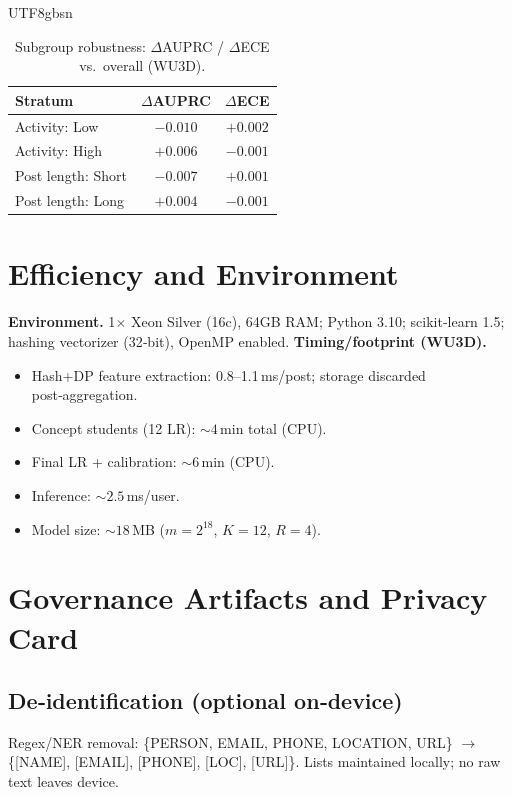 \documentclass[acmsmall,natbib]{acmart}
\begin{document}
\begin{CJK*}{UTF8}{gbsn}
\begin{table}[h]
\centering
\caption{Subgroup robustness: $\Delta$AUPRC / $\Delta$ECE vs.\ overall (WU3D).}
\label{tab:subgroups}
\setlength{\tabcolsep}{6.2pt}
\begin{tabular}{lcc}
\toprule
\textbf{Stratum} & \textbf{$\Delta$AUPRC} & \textbf{$\Delta$ECE} \\
\midrule
Activity: Low  & $-0.010$ & $+0.002$ \\
Activity: High & $+0.006$ & $-0.001$ \\
Post length: Short & $-0.007$ & $+0.001$ \\
Post length: Long  & $+0.004$ & $-0.001$ \\
\bottomrule
\end{tabular}
\end{table}


\section{Efficiency and Environment}
\label{app:env}
\textbf{Environment.} 1$\times$ Xeon Silver (16c), 64GB RAM; Python 3.10; scikit‑learn 1.5; hashing vectorizer (32‑bit), OpenMP enabled.  
\textbf{Timing/footprint (WU3D).}
\begin{itemize}[leftmargin=1.2em,itemsep=1pt]
\item Hash+DP feature extraction: 0.8--1.1\,ms/post; storage discarded post‑aggregation.
\item Concept students (12 LR): ${\sim}4$\,min total (CPU).
\item Final LR + calibration: ${\sim}6$\,min (CPU).
\item Inference: ${\sim}2.5$\,ms/user.
\item Model size: ${\sim}18$\,MB ($m{=}2^{18}$, $K{=}12$, $R{=}4$).
\end{itemize}


\section{Governance Artifacts and Privacy Card}
\label{app:governance}

\subsection{De‑identification (optional on‑device)}
Regex/NER removal: \{PERSON, EMAIL, PHONE, LOCATION, URL\} $\rightarrow$ \{[NAME], [EMAIL], [PHONE], [LOC], [URL]\}. Lists maintained locally; no raw text leaves device.


\end{CJK*}
\end{document}
